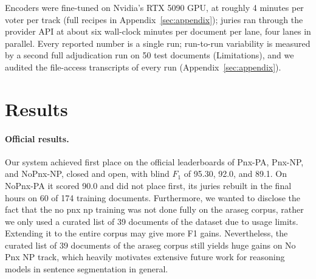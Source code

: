 \documentclass[11pt]{article}
\begin{document}
Encoders were fine-tuned on Nvidia's RTX 5090 GPU, at roughly 4 minutes per voter per
track (full recipes in Appendix~\ref{sec:appendix}); juries ran through the provider
API at about six wall-clock minutes per document per lane, four lanes in parallel.
Every reported number is a single run; run-to-run variability is measured by a second
full adjudication run on 50 test documents (Limitations), and we audited the
file-access transcripts of every run (Appendix~\ref{sec:appendix}).
\section{Results}
\label{sec:results}
\paragraph{Official results.}
Our system achieved first place on the official leaderboards of Pnx-PA, Pnx-NP, and
NoPnx-NP, closed and open, with blind $F_1$ of 95.30, 92.0, and 89.1. On NoPnx-PA it scored 90.0 and did not place first, its
juries rebuilt in the final hours on 60 of 174 training documents. Furthermore, we
wanted to disclose the fact that the no pnx np training was not done fully on the
araseg corpus, rather we only used a curated list of 39 documents of the dataset due
to usage limits. Extending it to the entire corpus may give more F1 gains.
Nevertheless, the curated list of 39 documents of the araseg corpus still yields
huge gains on No Pnx NP track, which heavily motivates extensive future work for
reasoning models in sentence segmentation in general.
\end{document}

